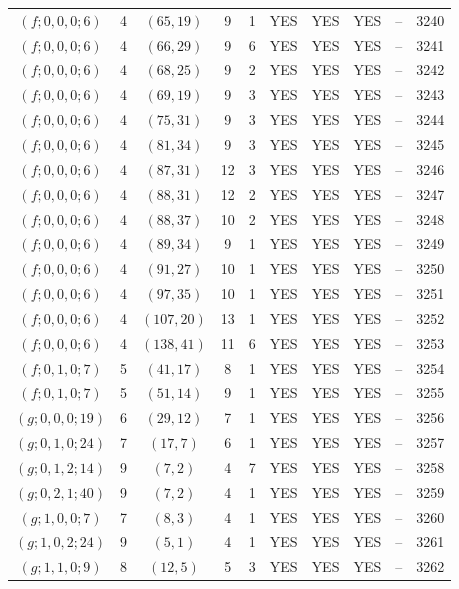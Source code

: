 \begin{longtable}{|c|c|c|c|c|c|c|c|c|c|}
$(f; 0, 0, 0; 6)$ & 4 & $(65, 19)$ & 9 & 1 & YES & YES & YES & -- & 3240\\
$(f; 0, 0, 0; 6)$ & 4 & $(66, 29)$ & 9 & 6 & YES & YES & YES & -- & 3241\\
$(f; 0, 0, 0; 6)$ & 4 & $(68, 25)$ & 9 & 2 & YES & YES & YES & -- & 3242\\
$(f; 0, 0, 0; 6)$ & 4 & $(69, 19)$ & 9 & 3 & YES & YES & YES & -- & 3243\\
$(f; 0, 0, 0; 6)$ & 4 & $(75, 31)$ & 9 & 3 & YES & YES & YES & -- & 3244\\
$(f; 0, 0, 0; 6)$ & 4 & $(81, 34)$ & 9 & 3 & YES & YES & YES & -- & 3245\\
$(f; 0, 0, 0; 6)$ & 4 & $(87, 31)$ & 12 & 3 & YES & YES & YES & -- & 3246\\
$(f; 0, 0, 0; 6)$ & 4 & $(88, 31)$ & 12 & 2 & YES & YES & YES & -- & 3247\\
$(f; 0, 0, 0; 6)$ & 4 & $(88, 37)$ & 10 & 2 & YES & YES & YES & -- & 3248\\
$(f; 0, 0, 0; 6)$ & 4 & $(89, 34)$ & 9 & 1 & YES & YES & YES & -- & 3249\\
$(f; 0, 0, 0; 6)$ & 4 & $(91, 27)$ & 10 & 1 & YES & YES & YES & -- & 3250\\
$(f; 0, 0, 0; 6)$ & 4 & $(97, 35)$ & 10 & 1 & YES & YES & YES & -- & 3251\\
$(f; 0, 0, 0; 6)$ & 4 & $(107, 20)$ & 13 & 1 & YES & YES & YES & -- & 3252\\
$(f; 0, 0, 0; 6)$ & 4 & $(138, 41)$ & 11 & 6 & YES & YES & YES & -- & 3253\\
$(f; 0, 1, 0; 7)$ & 5 & $(41, 17)$ & 8 & 1 & YES & YES & YES & -- & 3254\\
$(f; 0, 1, 0; 7)$ & 5 & $(51, 14)$ & 9 & 1 & YES & YES & YES & -- & 3255\\
$(g; 0, 0, 0; 19)$ & 6 & $(29, 12)$ & 7 & 1 & YES & YES & YES & -- & 3256\\
$(g; 0, 1, 0; 24)$ & 7 & $(17, 7)$ & 6 & 1 & YES & YES & YES & -- & 3257\\
$(g; 0, 1, 2; 14)$ & 9 & $(7, 2)$ & 4 & 7 & YES & YES & YES & -- & 3258\\
$(g; 0, 2, 1; 40)$ & 9 & $(7, 2)$ & 4 & 1 & YES & YES & YES & -- & 3259\\
$(g; 1, 0, 0; 7)$ & 7 & $(8, 3)$ & 4 & 1 & YES & YES & YES & -- & 3260\\
$(g; 1, 0, 2; 24)$ & 9 & $(5, 1)$ & 4 & 1 & YES & YES & YES & -- & 3261\\
$(g; 1, 1, 0; 9)$ & 8 & $(12, 5)$ & 5 & 3 & YES & YES & YES & -- & 3262\\

\end{longtable}
